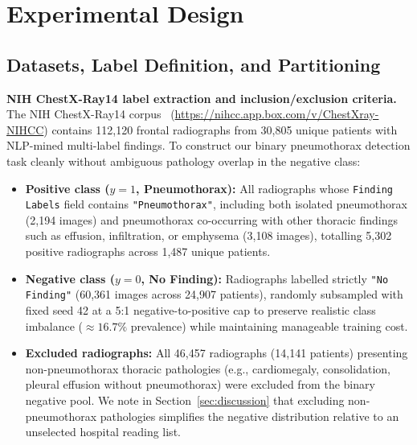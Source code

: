 \documentclass[diagnostics,article,submit,moreauthors]{Definitions/mdpi}
\newcommand{\rev}[1]{#1}
\begin{document}
\section{Experimental Design}
\label{sec:experimental}

\subsection{Datasets, Label Definition, and Partitioning}

\textbf{NIH ChestX-Ray14 label extraction and inclusion/exclusion criteria.} \rev{The NIH ChestX-Ray14 corpus~\cite{wang2017chestxray} (\url{https://nihcc.app.box.com/v/ChestXray-NIHCC}) contains 112,120 frontal radiographs from 30,805 unique patients with NLP-mined multi-label findings. To construct our binary pneumothorax detection task cleanly without ambiguous pathology overlap in the negative class:
\begin{itemize}
\item \textbf{Positive class ($y=1$, Pneumothorax):} All radiographs whose \texttt{Finding Labels} field contains \texttt{"Pneumothorax"}, including both isolated pneumothorax (2,194 images) and pneumothorax co-occurring with other thoracic findings such as effusion, infiltration, or emphysema (3,108 images), totalling 5,302 positive radiographs across 1,487 unique patients.
\item \textbf{Negative class ($y=0$, No Finding):} Radiographs labelled strictly \texttt{"No Finding"} (60,361 images across 24,907 patients), randomly subsampled with fixed seed 42 at a 5:1 negative-to-positive cap to preserve realistic class imbalance ($\approx 16.7\%$ prevalence) while maintaining manageable training cost.
\item \textbf{Excluded radiographs:} All 46,457 radiographs (14,141 patients) presenting non-pneumothorax thoracic pathologies (e.g., cardiomegaly, consolidation, pleural effusion without pneumothorax) were excluded from the binary negative pool. We note in Section~\ref{sec:discussion} that excluding non-pneumothorax pathologies simplifies the negative distribution relative to an unselected hospital reading list.
\end{itemize}}
\end{document}
